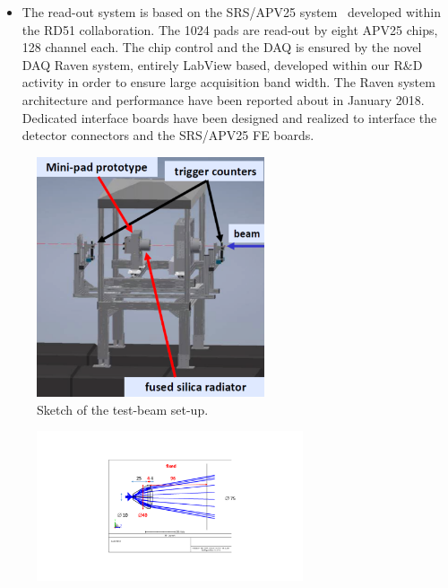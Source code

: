 \begin{enumerate}
\begin{itemize}
\item The read-out system is based on the SRS/APV25 system~\cite{1748-0221-8-03-C03015} developed within the RD51 collaboration. The 1024 pads are read-out by eight APV25 chips, 128 channel each. The chip control and the DAQ is ensured by the novel DAQ Raven system,  entirely
LabView based, developed within our R\&D activity in order  to ensure large acquisition band width. The Raven  system architecture and performance have been reported about in January 2018. Dedicated interface boards have been designed and realized to interface the detector connectors and the SRS/APV25 FE boards.
\end{itemize}
\begin{figure}
\begin{center}
\includegraphics[width=0.6\textwidth]{INFN_plots/set-up_sketch}
\caption{\label{fig:set-up_sketch}
Sketch of the test-beam set-up.
}
\end{center}
\end{figure}
\begin{figure}
			\begin{center}
            \includegraphics[width=0.7\textwidth]{INFN_plots/radiator}

\end{center}
\end{figure}
\end{enumerate}
